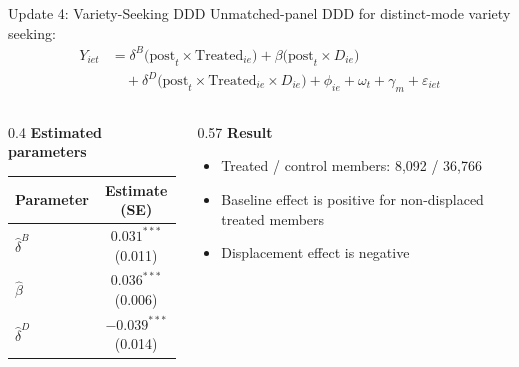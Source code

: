 \documentclass[aspectratio=169]{beamer}  %
\begin{document}
\begin{frame}{Update 4: Variety-Seeking DDD}
Unmatched-panel DDD for distinct-mode variety seeking:
\begingroup
\small
\[
\begin{aligned}
Y_{iet} &= \delta^B \bigl(\text{post}_{t} \times \text{Treated}_{ie}\bigr)
+ \beta \bigl(\text{post}_{t} \times D_{ie}\bigr) \\
&\quad + \delta^D \bigl(\text{post}_{t} \times \text{Treated}_{ie} \times D_{ie}\bigr)
+ \phi_{ie} + \omega_t + \gamma_m + \varepsilon_{iet}
\end{aligned}
\]
\endgroup

\begin{columns}[T]
\begin{column}{0.4\linewidth}
\textbf{Estimated parameters}
\begin{table}[h]
\centering
\scriptsize
\begin{tabular}{lc}
\toprule
Parameter & Estimate (SE) \\
\midrule
$\hat{\delta}^B$ & $0.031^{***}$ (0.011) \\
$\hat{\beta}$ & $0.036^{***}$ (0.006) \\
$\hat{\delta}^D$ & $-0.039^{***}$ (0.014) \\
\bottomrule
\end{tabular}
\end{table}
\end{column}
\begin{column}{0.57\linewidth}
\textbf{Result}
\begin{itemize}
    \item Treated / control members: 8,092 / 36,766
    \item Baseline effect is positive for non-displaced treated members
    \item Displacement effect is negative
\end{itemize}
\end{column}
\end{columns}
\end{frame}
\end{document}
